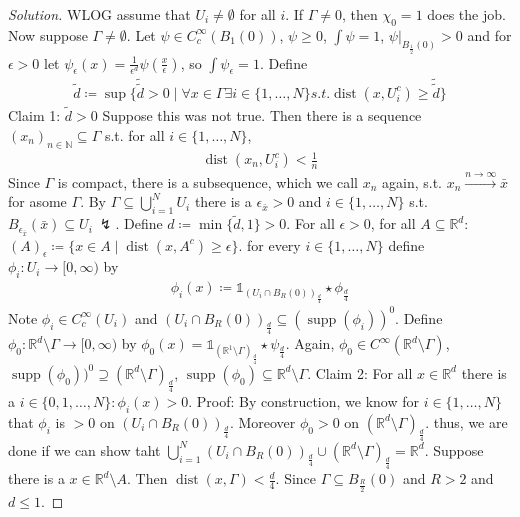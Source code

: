 \documentclass{report}
\theoremstyle{tommy}
\newcommand{\dist}{\operatorname{dist}}
\newcommand{\supp}{\operatorname{supp}}
\begin{document}
  \begin{proof}[Solution]
    WLOG assume that \(U_i \ne \emptyset\) for all \(i\). If \(\Gamma \ne 0\), then \(\chi_0 = 1\) does the job. Now suppose \(\Gamma \ne \emptyset\). Let \(\psi \in C_c^\infty(B_1(0))\), \(\psi \ge 0\), \(\int \psi = 1\), \(\psi|_{B_{\frac{1}{2}}(0)} > 0\) and for \(\epsilon > 0\) let \(\psi_\epsilon(x) = \frac{1}{\epsilon^d} \psi \left(\frac{x}{\epsilon}\right)\), so \(\int \psi_\epsilon = 1\). Define \begin{align*}
      \tilde d \coloneqq \sup \{\tilde{\tilde d} > 0 \mid \forall x \in \Gamma \exists i \in \{1, \dots, N\} s.t. \dist(x, U_i^c) \ge \tilde{\tilde d}\}
    \end{align*}
    Claim 1: \(\tilde d  > 0\) Suppose this was not true. Then there is a sequence \((x_n)_{n \in \mathbb{N}} \subseteq \Gamma\) s.t. for all \(i \in \{1, \dots, N\}\), 
    \begin{align*}
      \dist(x_n, U_i^c) < \frac{1}{n}
    \end{align*}
    Since \(\Gamma\) is compact, there is a subsequence, which we call \(x_n\) again, s.t. \(x_n \xrightarrow{n \to \infty} \bar x\) for asome \(\Gamma\). By \(\Gamma \subseteq \bigcup_{i=1}^N U_i\) there is a \(\epsilon_{\bar x} > 0\) and \(i \in \{1, \dots, N\}\) s.t. \(B_{\epsilon_{\bar x}}(\bar x) \subseteq U_i\ \lightning\).
    Define \(d \coloneqq \min\{\tilde d, 1\} > 0\). For all \(\epsilon > 0\), for all \(A \subseteq \mathbb{R}^d\): \((A)_\epsilon \coloneqq \{x \in A \mid \dist(x, A^c) \ge \epsilon\}\). for every \(i \in \{1, \dots, N\}\) define \(\phi_i: U_i \to [0,\infty)\) by
    \begin{align*}
      \phi_i(x) \coloneqq \mathbb{1}_{(U_i \cap B_R(0))_{\frac{d}{4}}} \star \phi_{\frac{d}{4}}
    \end{align*}
    Note \(\phi_i \in C_c^\infty(U_i)\) and \((U_i \cap B_R(0))_{\frac{d}{4}} \subseteq (\supp(\phi_i))^0\). Define \(\phi_0: \mathbb{R}^d \setminus \Gamma \to [0, \infty)\) by \(\phi_0(x) = \mathbb{1}_{(\mathbb{R}^1 \setminus \Gamma)_{\frac{d}{4}}} \star \psi_{\frac{d}{4}}\). Again, \(\phi_0 \in C^\infty(\mathbb{R}^d \setminus \Gamma)\), \(\supp(\phi_0))^0 \supseteq (\mathbb{R}^d \setminus \Gamma)_{\frac{d}{4}}\), \(\supp(\phi_0) \subseteq \mathbb{R}^d \setminus \Gamma\). 
    Claim 2: For all \(x \in \mathbb{R}^d\) there is a \(i \in \{0, 1, \dots, N\}: \phi_i (x) > 0\). Proof: By construction, we know for \(i \in \{1, \dots, N\}\) that \(\phi_i\) is \(>0\) on \((U_i \cap B_R(0))_{\frac{d}{4}}\). Moreover \(\phi_0 > 0\) on \((\mathbb{R}^d \setminus \Gamma)_{\frac{d}{4}}\). thus, we are done if we can show taht \(\bigcup_{i=1}^N (U_i \cap B_R(0))_{\frac{d}{4}} \cup (\mathbb{R}^d \setminus \Gamma)_{\frac{d}{4}} = \mathbb{R}^d\). Suppose there is a \(x \in \mathbb{R}^d \setminus A\). Then \(\dist(x, \Gamma) < \frac{d}{4}\). Since \(\Gamma \subseteq B_{\frac{R}{2}}(0)\) and \(R > 2\) and \(d \le 1\).

\end{proof}
\end{document}

